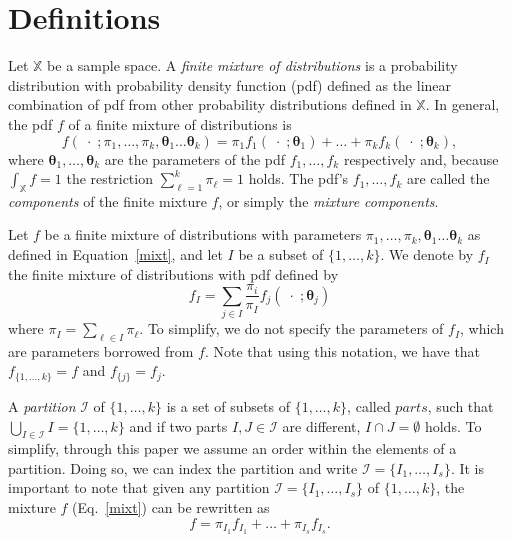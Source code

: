 \documentclass[10pt, a4paper]{article}
\newcommand{\m}[1]{\boldsymbol{#1}}
\begin{document}
\section{Definitions}
\label{definitions}

Let $\mathbb{X}$ be a sample space. A \emph{finite mixture of distributions} is a probability distribution with probability density function (pdf) defined as the linear combination of pdf from other probability distributions defined in $\mathbb{X}$. In general, the pdf $f$ of a finite mixture of distributions is
\begin{equation}\label{mixt}
f(\;\cdot\; ; \pi_1, \dots, \pi_k, \m\theta_1 \dots \m\theta_k) = \pi_1 f_1(\;\cdot\; ; \m\theta_1) + \dots + \pi_k f_k(\;\cdot\; ; \m\theta_k),
\end{equation}
where $\m\theta_1, \dots,  \m\theta_k$ are the parameters of the pdf $f_1, \dots, f_k$ respectively and, because $\int_{\mathbb{X}}f = 1$ the restriction $\sum_{\ell = 1}^k \pi_\ell = 1$ holds. The pdf's $f_1, \dots, f_k$ are called the \emph{components} of the finite mixture $f$, or simply the \emph{mixture components}.

Let $f$ be a finite mixture of distributions with  parameters  $\pi_1, \dots, \pi_k, \m\theta_1 \dots \m\theta_k$ as defined in Equation~\ref{mixt}, and let $I$  be a subset of $\{1, \dots, k\}$. We denote by $f_I$ the finite mixture of distributions with pdf defined by
\[
f_I = \sum_{j \in I} \frac{\pi_i}{\pi_I} f_j(\;\cdot\; ; \m\theta_j)
\]
where $\pi_I = \sum_{\ell \in I} \pi_\ell$. To simplify, we do not specify the parameters of $f_I$, which are parameters borrowed from $f$. Note that using this notation, we have that $f_{\{1, \dots, k\}} = f$ and $f_{\{j\}} = f_j$.

A \emph{partition} $\mathcal{I}$ of $\{1, \dots, k\}$ is a set of subsets of $\{1, \dots, k\}$, called $parts$, such that $\bigcup_{I \in \mathcal{I}} I = \{1, \dots, k\}$ and  if two parts $I, J \in \mathcal{I}$ are different, $I \cap J = \emptyset$ holds. To simplify, through this paper we assume an order within the elements of a partition. Doing so, we can index the partition and write $\mathcal{I} = \{ I_1, \dots, I_s\}$. It is important to note that given any partition $\mathcal{I} = \{ I_1, \dots, I_s\}$ of $\{1, \dots, k\}$, the mixture $f$ (Eq.~\ref{mixt}) can be rewritten as
\begin{equation}
f = \pi_{I_1} f_{I_1} + \dots + \pi_{I_s} f_{I_s}.
\label{mixt_part}
\end{equation}
\end{document}
